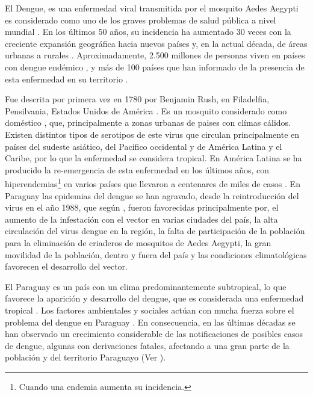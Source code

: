 
El Dengue, es una enfermedad viral transmitida por el mosquito Aedes Aegypti es considerado como
uno de los graves problemas de salud pública a nivel mundial
\citep{dengueUruguayCap1, world2009dengue, DIBO2005}. En los últimos 50 años, su incidencia ha
aumentado 30 veces con la creciente expansión geográfica hacia nuevos países y, en la actual
década, de áreas urbanas a rurales \cite{world2009dengue}. Aproximadamente, 2.500 millones de
personas viven en países con dengue endémico \cite{world2009dengue, gustavo2006dengue}, y más de
100 países que han informado de la presencia de esta enfermedad en su territorio
\cite{gustavo2006dengue}.

Fue descrita por primera vez en 1780 por Benjamin Rush, en Filadelfia, Pensilvania, Estados Unidos
de América \citep{gustavo2006dengue}. Es un mosquito considerado como doméstico
\cite{luevano1993ciclo}, que, principalmente a zonas urbanas de paises con clímas cálidos. Existen
distintos tipos de serotipos de este virus que circulan principalmente en países del sudeste
asiático, del Pacifico occidental y de América Latina y el Caribe, por lo que la enfermedad se
considera tropical\citep{gustavo2006dengue}. En América Latina se ha producido la re-emergencia de
esta enfermedad en los últimos años, con hiperendemias\footnote{ Cuando una endemia aumenta su
incidencia.} en varios países que llevaron a centenares de miles de casos \citep{dengueUruguayCap1}
. En Paraguay las epidemias del dengue se han agravado, desde la reintroducción del virus en el
año 1988, que según \cite{planControlMspbs2014}, fueron favorecidas principalmente por, el aumento
de la infestación con el vector en varias ciudades del país, la alta circulación del virus dengue
en la región, la falta de participación de la población para la eliminación de criaderos de
mosquitos de Aedes Aegypti, la gran movilidad de la población, dentro y fuera del país y las
condiciones climatológicas favorecen el desarrollo del vector.

El Paraguay es un país con un clima predominantemente subtropical, lo que favorece la aparición y
desarrollo del dengue, que es considerada una enfermedad tropical \cite{gustavo2006dengue,DIBO2005}
. Los factores ambientales y sociales actúan con mucha fuerza sobre el problema del dengue en
Paraguay \cite{website:mspbsHistoria2014}. En consecuencia, en las últimas décadas se han
observado un crecimiento considerable de las notificaciones de posibles casos de dengue, algunas
con derivaciones fatales, afectando a una gran parte de la población y del territorio Paraguayo
(Ver ).

